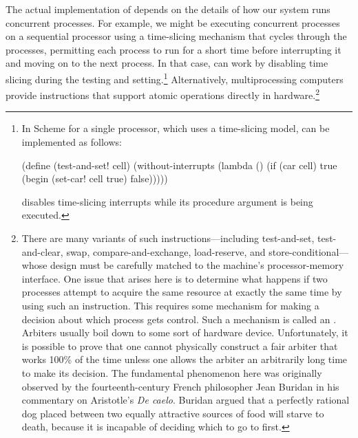 The actual implementation of  depends on the details of how
our system runs concurrent processes.  For example, we might be executing
concurrent processes on a sequential processor using a time-slicing mechanism
that cycles through the processes, permitting each process to run for a short
time before interrupting it and moving on to the next process.  In that case,
  can work by disabling time slicing during the testing and
setting.\footnote{In  Scheme for a single processor, which uses a
time-slicing model,  can be implemented as follows:

\begin{compactCodeBlock}
(define (test-and-set! cell)
  (without-interrupts
   (lambda ()
     (if (car cell)
         true
         (begin (set-car! cell true)
                false)))))
\end{compactCodeBlock}

\noindent
{} disables time-slicing interrupts while its procedure
argument is being executed.}  Alternatively, multiprocessing computers provide
instructions that support atomic operations directly in
hardware.\footnote{There are many variants of such instructions---including
test-and-set, test-and-clear, swap, compare-and-exchange, load-reserve, and
store-conditional---whose design must be carefully matched to the machine's
processor-memory interface.  One issue that arises here is to determine what
happens if two processes attempt to acquire the same resource at exactly the
same time by using such an instruction.  This requires some mechanism for
making a decision about which process gets control.  Such a mechanism is called
an .  Arbiters usually boil down to some sort of hardware
device.  Unfortunately, it is possible to prove that one cannot physically
construct a fair arbiter that works 100\% of the time unless one allows the
arbiter an arbitrarily long time to make its decision.  The fundamental
phenomenon here was originally observed by the fourteenth-century French
philosopher Jean Buridan in his commentary on Aristotle's \textit{De caelo}.
Buridan argued that a perfectly rational dog placed between two equally
attractive sources of food will starve to death, because it is incapable of
deciding which to go to first.}

